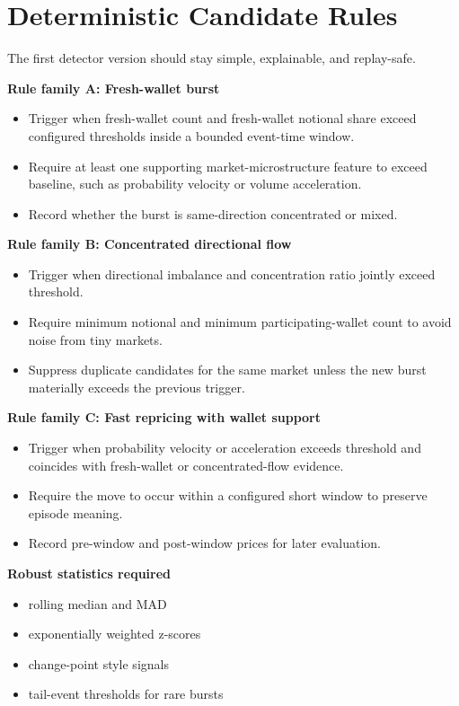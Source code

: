 \documentclass{article}
\begin{document}
\section*{Deterministic Candidate Rules}
The first detector version should stay simple, explainable, and replay-safe.

\textbf{Rule family A: Fresh-wallet burst}
\begin{itemize}
\item Trigger when fresh-wallet count and fresh-wallet notional share exceed configured thresholds inside a bounded event-time window.
\item Require at least one supporting market-microstructure feature to exceed baseline, such as probability velocity or volume acceleration.
\item Record whether the burst is same-direction concentrated or mixed.
\end{itemize}

\textbf{Rule family B: Concentrated directional flow}
\begin{itemize}
\item Trigger when directional imbalance and concentration ratio jointly exceed threshold.
\item Require minimum notional and minimum participating-wallet count to avoid noise from tiny markets.
\item Suppress duplicate candidates for the same market unless the new burst materially exceeds the previous trigger.
\end{itemize}

\textbf{Rule family C: Fast repricing with wallet support}
\begin{itemize}
\item Trigger when probability velocity or acceleration exceeds threshold and coincides with fresh-wallet or concentrated-flow evidence.
\item Require the move to occur within a configured short window to preserve episode meaning.
\item Record pre-window and post-window prices for later evaluation.
\end{itemize}

\textbf{Robust statistics required}
\begin{itemize}
\item rolling median and MAD
\item exponentially weighted z-scores
\item change-point style signals
\item tail-event thresholds for rare bursts
\end{itemize}
\end{document}
